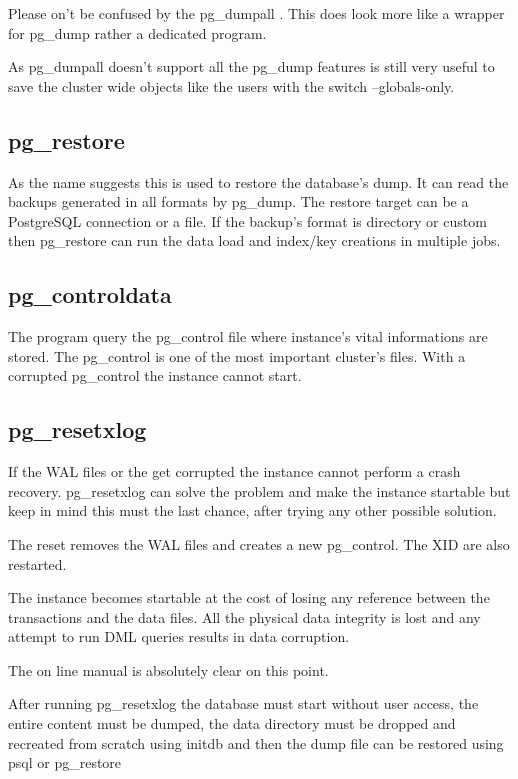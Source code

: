 Please on't be confused by the pg\_dumpall . This does look more like a wrapper for pg\_dump rather a dedicated program.

As pg\_dumpall doesn't support all the pg\_dump features is still very useful to save the cluster wide objects like the users with the switch --globals-only.



\subsection{pg\_restore}
As the name suggests this is used to restore the database's dump.
It can read the backups generated in all formats by pg\_dump. 
The restore target can be a PostgreSQL connection or a file. 
If the backup's format is directory or custom then pg\_restore can run the data load and
index/key creations in multiple jobs.

\subsection{pg\_controldata}\label{sub:PGCONTROLDATA}
The program query the pg\_control file where instance's vital informations are stored.
The pg\_control is one of the most important cluster's files.
With a corrupted pg\_control the instance cannot start. 

\subsection{pg\_resetxlog}

If the WAL files or the get corrupted the instance cannot perform a crash recovery.
pg\_resetxlog can solve the problem and make the instance startable but keep in mind 
this must the last chance, after trying any other possible solution.

The reset removes the WAL files and creates a new pg\_control.
The XID are also restarted. 

The instance becomes startable at the cost of losing any reference between the transactions 
and the data files. All the physical data integrity is lost and
any attempt to run DML queries results in data corruption. 

The on line manual is absolutely clear on this point.

After running pg\_resetxlog the database must start without user access, 
the entire content must be dumped, the data directory must be dropped and recreated 
from scratch using initdb and then the dump file can be restored using psql or pg\_restore

